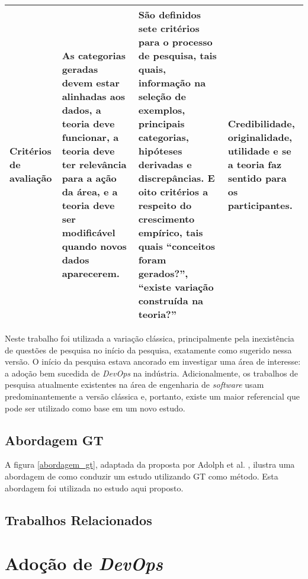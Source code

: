 \begin{table}[hb!]
{\begin{tabular}{|p{3cm}|p{5.7cm}|p{5.7cm}|p{5.7cm}|}
\textbf{Critérios de avaliação}
& As categorias geradas devem estar alinhadas aos dados, a teoria deve funcionar, a teoria deve ter relevância para a ação da área, e a teoria deve ser modificável quando novos dados aparecerem.
& São definidos sete critérios para o processo de pesquisa, tais quais, informação na seleção de exemplos, principais categorias, hipóteses derivadas e discrepâncias. E oito critérios a respeito do crescimento empírico, tais quais ``conceitos foram gerados?'', ``existe variação construída na teoria?''
& Credibilidade, originalidade, utilidade e se a teoria faz sentido para os participantes. \\
\hline

\end{tabular}}
\end{table}


Neste trabalho foi utilizada a variação clássica, principalmente pela
inexistência de questões de pesquisa no início da pesquisa, exatamente como
sugerido nessa versão. O início da pesquisa estava ancorado em investigar uma
área de interesse: a adoção bem sucedida de \textit{DevOps} na indústria.
Adicionalmente, os trabalhos de pesquisa atualmente existentes na área
de engenharia de \textit{software} usam predominantemente a versão clássica
\cite{stol2016grounded} e, portanto, existe um maior referencial que pode ser
utilizado como base em um novo estudo.

\subsection{Abordagem \acrshort{GT}}

A figura \ref{abordagem_gt}, adaptada da proposta por Adolph et al.
\cite{using_gt_adolph}, ilustra uma abordagem de como conduzir um estudo
utilizando \acrshort{GT} como método. Esta abordagem foi utilizada no estudo
aqui proposto.

%

\subsection{Trabalhos Relacionados}

\iffalse
\section{Adoção de \textit{DevOps}}\label{secao_adocao_devops}

